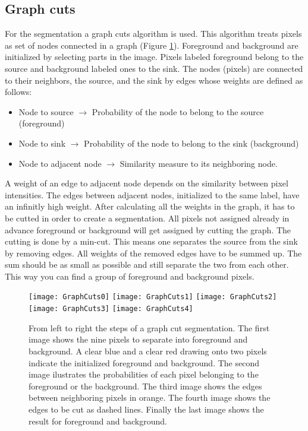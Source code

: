 \subsection{Graph cuts}
For the segmentation a graph cuts algorithm is used. This algorithm treats
pixels as set of nodes connected in a graph (Figure
\ref{fig:graphCutsExplanaition}). Foreground and background are initialized by
selecting parts in the image.
Pixels labeled foreground belong to the source and
background labeled ones to the sink. The nodes (pixels) are connected to their
neighbors, the source, and the sink by
edges whose weights are defined as follows:
\begin{itemize}
  \item Node to source $\rightarrow$ Probability of the node to belong to the source (foreground)
  \item Node to sink $\rightarrow$ Probability of the node to belong to the sink (background)
  \item Node to adjacent node $\rightarrow$ Similarity measure to its neighboring node. 
\end{itemize}
A weight of an edge to adjacent node depends on the similarity between pixel intensities.
The edges between adjacent nodes, initialized to the same label, have an
infinitly high weight.
After calculating all the weights in the graph, it has to be cutted in order to
create a segmentation. All pixels not assigned already in advance foreground or background will get assigned by
cutting the graph. The cutting is done by a min-cut. This means one separates the
source from the sink by removing edges. All weights of the removed edges have to be summed up.
The sum should be as small as possible and still separate the two from each
other. This way you can find a group of foreground and background pixels.
\begin{figure}[H]
  \centering
  \texttt{[image: GraphCuts0]} 
  \endminipage
  \hfill
  \texttt{[image: GraphCuts1]} 
  \endminipage
  \hfill 
  \texttt{[image: GraphCuts2]} 
  \endminipage
  \hfill
  \texttt{[image: GraphCuts3]} 
  \endminipage
  \hfill
  \texttt{[image: GraphCuts4]} 
  \endminipage
  \hfill
 \caption{From left to right the steps of a graph cut segmentation. The first
   image shows the nine pixels to separate into foreground and background. A
   clear blue and a clear red drawing onto two pixels indicate the initialized
   foreground and background. The
   second image ilustrates the probabilities of each pixel belonging to the
   foreground or the background. The third image shows the edges between
   neighboring pixels in orange. The fourth image shows the edges to be cut as
   dashed lines. Finally the last image shows the result for foreground and background. }
  \label{fig:graphCutsExplanaition}
\end{figure}

